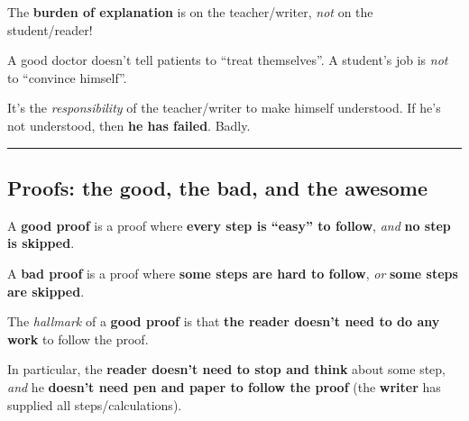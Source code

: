 \vs
The {\bf burden of explanation} is on the teacher/writer, {\it not} on the student/reader! \par
A good doctor doesn't tell patients to ``treat themselves''. A student's job is {\it not} to ``convince himself''. \par
It's the {\it responsibility} of the teacher/writer to make himself understood. If he's not understood, then {\bf he has failed}. Badly. \par





\vs\hrule\vskip1pt
\subsection{\bf Proofs: the good, the bad, and the awesome}

A {\bf good proof} is a proof where {\bf every step is ``easy'' to follow}, {\it and} {\bf no step is skipped}. \par

\vs
A {\bf bad proof} is a proof where {\bf some steps are hard to follow}, {\it or} {\bf some steps are skipped}. \par

\vs
The {\it hallmark} of a {\bf good proof} is that {\bf the reader doesn't need to do any work} to follow the proof. \par
In particular, the {\bf reader doesn't need to stop and think} about some step, {\it and} he {\bf doesn't need pen and paper to follow the proof} (the {\bf writer} has supplied all steps/calculations).

